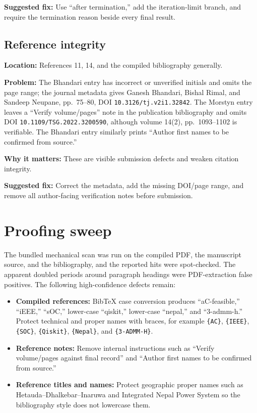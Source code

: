 \documentclass[11pt]{article}
\newcommand{\loc}[1]{\textbf{Location:} #1}
\newcommand{\problem}{\textbf{Problem:}}
\newcommand{\impact}{\textbf{Why it matters:}}
\newcommand{\fix}{\textbf{Suggested fix:}}
\begin{document}
\fix{} Use ``after termination,'' add the iteration-limit branch, and require
the termination reason beside every final result.

\subsection*{Reference integrity}

\loc{References 11, 14, and the compiled bibliography generally.}

\problem{} The Bhandari entry has incorrect or unverified initials and omits
the page range; the journal metadata gives Ganesh Bhandari, Bishal Rimal, and
Sandeep Neupane, pp.~75--80, DOI \texttt{10.3126/tj.v2i1.32842}.  The Morstyn
entry leaves a ``Verify volume/pages'' note in the publication bibliography
and omits DOI \texttt{10.1109/TSG.2022.3200590}, although volume 14(2),
pp.~1093--1102 is verifiable.  The Bhandari entry similarly prints ``Author
first names to be confirmed from source.''

\impact{} These are visible submission defects and weaken citation integrity.

\fix{} Correct the metadata, add the missing DOI/page range, and remove all
author-facing verification notes before submission.

\section*{Proofing sweep}

The bundled mechanical scan was run on the compiled PDF, the manuscript
source, and the bibliography, and the reported hits were spot-checked.  The
apparent doubled periods around paragraph headings were PDF-extraction false
positives.  The following high-confidence defects remain:

\begin{itemize}
  \item \textbf{Compiled references:} BibTeX case conversion produces
  ``aC-feasible,'' ``iEEE,'' ``sOC,'' lower-case ``qiskit,'' lower-case
  ``nepal,'' and ``3-admm-h.''  Protect technical and proper names with braces,
  for example \texttt{\{AC\}}, \texttt{\{IEEE\}}, \texttt{\{SOC\}},
  \texttt{\{Qiskit\}}, \texttt{\{Nepal\}}, and \texttt{\{3-ADMM-H\}}.
  \item \textbf{Reference notes:} Remove internal instructions such as
  ``Verify volume/pages against final record'' and ``Author first names to be
  confirmed from source.''
  \item \textbf{Reference titles and names:} Protect geographic proper names
  such as Hetauda--Dhalkebar--Inaruwa and Integrated Nepal Power System so the
  bibliography style does not lowercase them.
\end{itemize}
\end{document}
